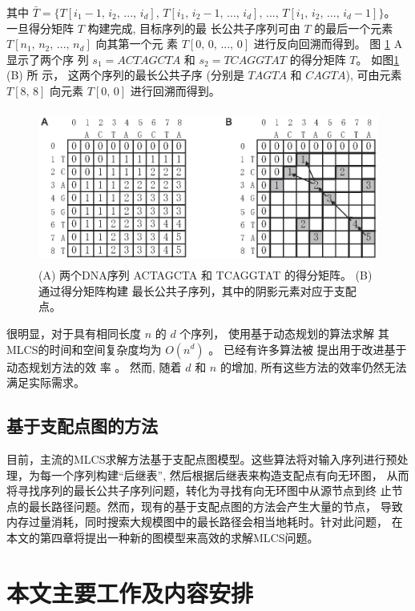 其中
$\bar{T} = \{T[i_1-1,\, i_2,\, ...,\, i_d],\, T[i_1,\, i_2-1,\, ...,\, i_d],\,
...,\, T[i_1,\, i_2,\, ...,\, i_d-1]\}$。 一旦得分矩阵 $T$ 构建完成, 目标序列的最
长公共子序列可由 $T$ 的最后一个元素 $T[n_1,\, n_2,\, ...,\, n_d]$ 向其第一个元
素 $T[0,\, 0,\, ...,\, 0]$ 进行反向回溯而得到。 图 \ref{fig:DM} A 显示了两个序
列 $s_1 = ACTAGCTA$ 和 $s_2 = TCAGGTAT$ 的得分矩阵 $T$。 如图\ref{fig:DM} (B) 所
示， 这两个序列的最长公共子序 (分别是 $TAGTA$ 和 $CAGTA$), 可由元素 $T[8,\, 8]$
向元素 $T[0,\, 0]$ 进行回溯而得到。

\begin{figure}[!h]
  \centering
  \includegraphics[height=2in, width=4.5in]{figures/4_MLCS/DM}
  \vspace{1em}
  \caption{(A) 两个DNA序列 ACTAGCTA 和 TCAGGTAT 的得分矩阵。 (B) 通过得分矩阵构建
    最长公共子序列，其中的阴影元素对应于支配点。}
\label{fig:DM}
\end{figure}

很明显，对于具有相同长度 $n$ 的 $d$ 个序列， 使用基于动态规划的算法求解
其MLCS的时间和空间复杂度均为 $O(n^d)$ \cite{Hsu1984}。 已经有许多算法被
提出用于改进基于动态规划方法的效
率 \cite{Hirschberg1977,Apostolico1992,Masek1980,Rick1994}。 然而, 随着
$d$ 和 $n$ 的增加, 所有这些方法的效率仍然无法满足实际需求。

\subsection{基于支配点图的方法}
\label{sec:DP}

目前，主流的MLCS求解方法基于支配点图模型。这些算法将对输入序列进行预处
理，为每一个序列构建“后继表”, 然后根据后继表来构造支配点有向无环图，
从而将寻找序列的最长公共子序列问题，转化为寻找有向无环图中从源节点到终
止节点的最长路径问题。然而，现有的基于支配点图的方法会产生大量的节点，
导致内存过量消耗，同时搜索大规模图中的最长路径会相当地耗时。针对此问题，
在本文的第四章将提出一种新的图模型来高效的求解MLCS问题。


\section{本文主要工作及内容安排}
\label{sec:org}

